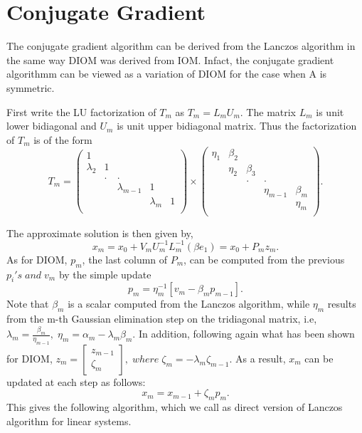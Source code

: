 \documentclass[10pt,a4paper]{article}
\begin{document}
\newpage

\section{Conjugate Gradient}

The conjugate gradient algorithm can be derived from the Lanczos algorithm in the same way DIOM was derived from IOM. Infact, the conjugate gradient algorithmm can be viewed as a variation of DIOM for the case when A is symmetric.

First write the LU factorization of $T_m$ as $T_m=L_mU_m.$ The matrix $L_m$ is unit lower bidiagonal and $U_m$ is unit upper bidiagonal matrix. Thus the factorization of $T_m$ is of the form
$$
T_m = 
\left( \begin{array}{ccccc}
1 &  &  &  &  \\
\lambda_2 & 1 &  &  &  \\
 & . & . &  &  \\
 &  & \lambda_{m-1} & 1 &  \\
 &  &  & \lambda_m & 1 \\
\end{array} \right)\times 
\left( \begin{array}{ccccc}
\eta_1 & \beta_2 &  &  &  \\
 & \eta_2 & \beta_3 &  &  \\
 &  & . & . &  \\
 &  &  & \eta_{m-1} & \beta_m \\
 &  &  &  & \eta_m \\
\end{array} \right).
$$

The approximate solution is then given by,
$$x_m=x_0+V_mU^{-1}_mL^{-1}_m(\beta e_1) = x_0+P_mz_m.$$
As for DIOM, $p_m$, the last column of $P_m$, can be computed from the previous $p_i's\;and\;v_m$ by the simple update
$$p_m=\eta^{-1}_m[v_m-\beta_mp_{m-1}].$$
Note that $\beta_m$ is a scalar computed from the Lanczos algorithm, while $\eta_m$ results from the m-th Gaussian elimination step on the tridiagonal matrix, i.e, $\lambda_m=\frac{\beta_m}{\eta_{m-1}},\;\eta_m=\alpha_m-\lambda_m\beta_m.$ In addition, following again what has been shown for DIOM, $z_m=\left[ \begin{array}{c} z_{m-1} \\ \zeta_m \end{array} \right],\;where\;\zeta_m=-\lambda_m\zeta_{m-1}.$
As a result, $x_m$ can be updated at each step as follows:
$$x_m=x_{m-1}+\zeta_mp_m.$$
This gives the following algorithm, which we call as direct version of Lanczos algorithm for linear systems.
\end{document}
